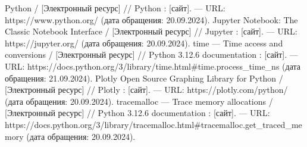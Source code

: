 \begin{thebibliography}{}
	  Python /  [Электронный ресурс] // Python : [сайт]. — URL: https://www.python.org/ (дата обращения: 20.09.2024).
	  Jupyter Notebook: The Classic Notebook Interface /  [Электронный ресурс] // Jupyter : [сайт]. — URL: https://jupyter.org/ (дата обращения: 20.09.2024).
	  time — Time access and conversions /  [Электронный ресурс] // Python 3.12.6 documentation : [сайт]. — URL: https://docs.python.org/3/library/time.html\#time.process\_time\_ns (дата обращения: 21.09.2024).
	  Plotly Open Source Graphing Library for Python /  [Электронный ресурс] // Plotly : [сайт]. — URL: https://plotly.com/python/ (дата обращения: 20.09.2024).
	  tracemalloc — Trace memory allocations /  [Электронный ресурс] // Python 3.12.6 documentation : [сайт]. — URL: https://docs.python.org/3/library/tracemalloc.html\#tracemalloc.get\_traced\_memory (дата обращения: 20.09.2024).
\end{thebibliography}

